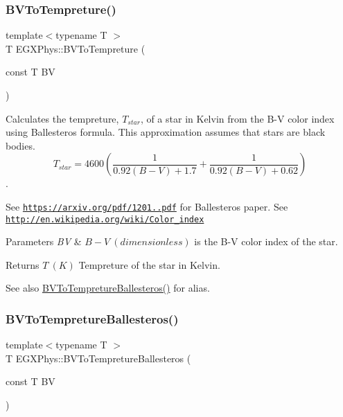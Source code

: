 \subsubsection{\texorpdfstring{B\+V\+To\+Tempreture()}{BVToTempreture()}}
{\footnotesize\ttfamily template$<$typename T $>$ \\
T E\+G\+X\+Phys\+::\+B\+V\+To\+Tempreture (\begin{DoxyParamCaption}\item[{const T}]{BV }\end{DoxyParamCaption})}



Calculates the tempreture, $T_{star}$, of a star in Kelvin from the B-\/V color index using Ballesteros\textquotesingle{} formula. This approximation assumes that stars are black bodies. \[T_{star}=4600 \left ( \frac{1}{0.92 (B-V)+ 1.7} + \frac{1}{0.92 (B-V) + 0.62} \right )\]. 

See \href{https://arxiv.org/pdf/1201.1809.pdf}{\tt https\+://arxiv.\+org/pdf/1201..\+pdf} for Ballesteros\textquotesingle{} paper. See \href{http://en.wikipedia.org/wiki/Color_index}{\tt http\+://en.\+wikipedia.\+org/wiki/\+Color\+\_\+index}


\begin{DoxyParams}{Parameters}
{\em BV} & $B-V\ (dimensionless)$ is the B-\/V color index of the star. \\
\hline
\end{DoxyParams}
\begin{DoxyReturn}{Returns}
$T\ (K)$ Tempreture of the star in Kelvin. 
\end{DoxyReturn}
\begin{DoxySeeAlso}{See also}
\mbox{\hyperlink{group___e_g_x_phys-_b-_v_color_gacefbc01847cd5fac2bbf132937392fd1}{B\+V\+To\+Tempreture\+Ballesteros()}} for alias. 
\end{DoxySeeAlso}
\mbox{\label{group___e_g_x_phys-_b-_v_color_gacefbc01847cd5fac2bbf132937392fd1}} 
\subsubsection{\texorpdfstring{B\+V\+To\+Tempreture\+Ballesteros()}{BVToTempretureBallesteros()}}
{\footnotesize\ttfamily template$<$typename T $>$ \\
T E\+G\+X\+Phys\+::\+B\+V\+To\+Tempreture\+Ballesteros (\begin{DoxyParamCaption}\item[{const T}]{BV }\end{DoxyParamCaption})}



